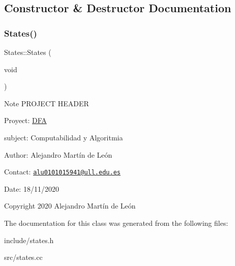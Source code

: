 \subsection{Constructor \& Destructor Documentation}
\mbox{\label{classStates_a8cf0b9ef14edb0704c74ac62ea338eab}} 
\subsubsection{\texorpdfstring{States()}{States()}}
{\footnotesize\ttfamily States\+::\+States (\begin{DoxyParamCaption}\item[{void}]{ }\end{DoxyParamCaption})}

\begin{DoxyNote}{Note}
P\+R\+O\+J\+E\+CT H\+E\+A\+D\+ER 

Proyect\+: \hyperlink{classDFA}{D\+FA} 

subject\+: Computabilidad y Algoritmia 

Author\+: Alejandro Martín de León 

Contact\+: \href{mailto:alu0101015941@ull.edu.es}{\tt alu0101015941@ull.\+edu.\+es} 

Date\+: 18/11/2020 

Copyright 2020 Alejandro Martín de León 
\end{DoxyNote}


The documentation for this class was generated from the following files\+:\begin{DoxyCompactItemize}
\item 
include/states.\+h\item 
src/states.\+cc\end{DoxyCompactItemize}
